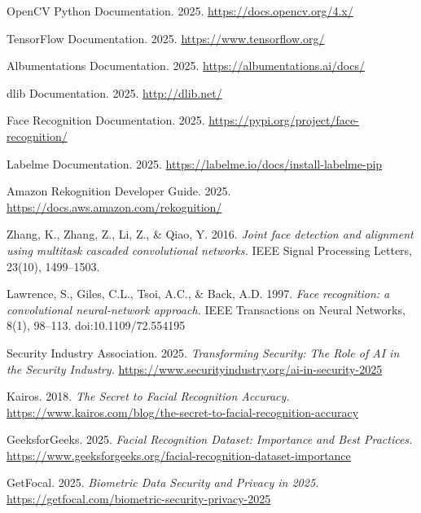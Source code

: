 \begin{thebibliography}{99}
OpenCV Python Documentation. 2025. \url{https://docs.opencv.org/4.x/}

TensorFlow Documentation. 2025. \url{https://www.tensorflow.org/}

Albumentations Documentation. 2025. \url{https://albumentations.ai/docs/}

dlib Documentation. 2025. \url{http://dlib.net/}

Face Recognition Documentation. 2025. \url{https://pypi.org/project/face-recognition/}

Labelme Documentation. 2025. \url{https://labelme.io/docs/install-labelme-pip}

Amazon Rekognition Developer Guide. 2025. \url{https://docs.aws.amazon.com/rekognition/}

Zhang, K., Zhang, Z., Li, Z., \& Qiao, Y. 2016. \emph{Joint face detection and alignment using multitask cascaded convolutional networks.} IEEE Signal Processing Letters, 23(10), 1499--1503.


Lawrence, S., Giles, C.L., Tsoi, A.C., \& Back, A.D. 1997. \emph{Face recognition: a convolutional neural-network approach.} IEEE Transactions on Neural Networks, 8(1), 98--113. doi:10.1109/72.554195

Security Industry Association. 2025. \emph{Transforming Security: The Role of AI in the Security Industry.} \url{https://www.securityindustry.org/ai-in-security-2025}

Kairos. 2018. \emph{The Secret to Facial Recognition Accuracy.} \url{https://www.kairos.com/blog/the-secret-to-facial-recognition-accuracy}

GeeksforGeeks. 2025. \emph{Facial Recognition Dataset: Importance and Best Practices.} \url{https://www.geeksforgeeks.org/facial-recognition-dataset-importance}

GetFocal. 2025. \emph{Biometric Data Security and Privacy in 2025.} \url{https://getfocal.com/biometric-security-privacy-2025}


\end{thebibliography}
